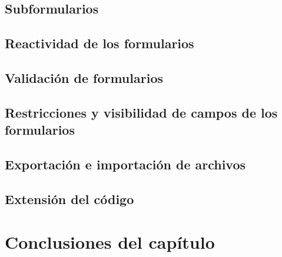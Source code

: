 \subsection{Subformularios }
\subsection{Reactividad de los formularios}
\subsection{Validación de formularios}
\subsection{Restricciones y visibilidad de campos de los formularios}
\subsection{Exportación e importación de archivos}
\subsection{Extensión del código}
\section{Conclusiones del capítulo}